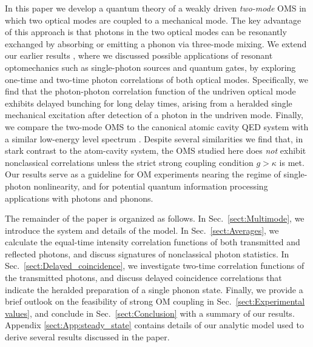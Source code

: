 In this paper we develop a quantum theory of a weakly driven
\emph{two-mode} OMS
\cite{Miao2009, Stannigel2012,Ludwig2012, BasiriEsfahani2012} 
in which two optical modes are coupled to
a mechanical mode. 
The key advantage of this approach is that
 photons in the two optical modes can be resonantly exchanged by absorbing or
 emitting a phonon via three-mode mixing.
 We extend our earlier results \cite{Stannigel2012}, where we discussed possible
 applications of resonant optomechanics such as single-photon sources and
 quantum gates,
 by exploring one-time and two-time photon correlations 
 of both optical modes.
 Specifically, we find that the photon-photon correlation function of the
 undriven optical mode exhibits delayed bunching for long delay times,
 arising from a heralded single mechanical excitation after detection of a
 photon in the undriven mode.
 Finally, we compare the two-mode OMS
 to the canonical atomic cavity QED system with 
 a similar low-energy level spectrum
 \cite{Carmichael1991, Brecha1999}.
 Despite several similarities we find that, 
 in stark contrast to the atom-cavity system, the OMS studied
 here does {\it not} exhibit nonclassical
 correlations unless the strict strong coupling condition $g >
 \kappa$ is met.
Our results serve as a guideline for OM experiments 
nearing the regime of 
single-photon nonlinearity, and for
potential quantum information processing applications
with photons and phonons.



The remainder of the paper is organized as follows. 
In
Sec.~\ref{sect:Multimode}, we introduce the system and details of the model.
In Sec.~\ref{sect:Averages}, we calculate the equal-time intensity correlation
functions of both  transmitted and  reflected photons, and discuss
signatures of nonclassical photon statistics.
In Sec.~\ref{sect:Delayed_coincidence}, 
we investigate two-time correlation functions
of the transmitted photons, and discuss delayed
coincidence correlations that indicate the heralded
preparation of a single phonon state.
Finally, we provide
a brief outlook on the feasibility of strong OM coupling 
in Sec.~\ref{sect:Experimental values}, 
and 
conclude
in Sec.~\ref{sect:Conclusion} with a summary of our
results.
Appendix \ref{sect:App:steady_state} contains details of our analytic model used to
derive several results discussed in the paper.




